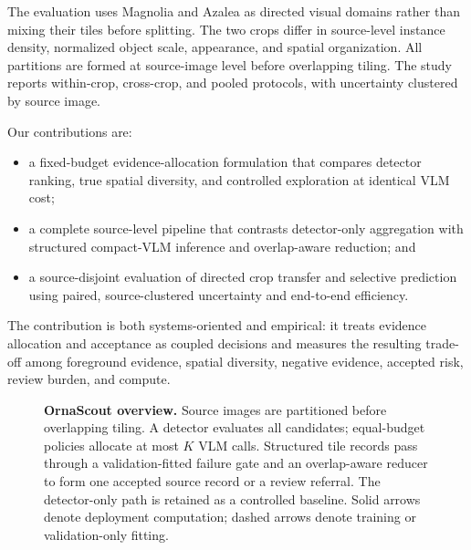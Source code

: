 The evaluation uses Magnolia and Azalea as directed visual domains rather than mixing their tiles before splitting. The two crops differ in source-level instance density, normalized object scale, appearance, and spatial organization. All partitions are formed at source-image level before overlapping tiling. The study reports within-crop, cross-crop, and pooled protocols, with uncertainty clustered by source image.

Our contributions are:
\begin{itemize}[leftmargin=*,nosep]
    \item a fixed-budget evidence-allocation formulation that compares detector ranking, true spatial diversity, and controlled exploration at identical VLM cost;
    \item a complete source-level pipeline that contrasts detector-only aggregation with structured compact-VLM inference and overlap-aware reduction; and
    \item a source-disjoint evaluation of directed crop transfer and selective prediction using paired, source-clustered uncertainty and end-to-end efficiency.
\end{itemize}

The contribution is both systems-oriented and empirical: it treats evidence allocation and acceptance as coupled decisions and measures the resulting trade-off among foreground evidence, spatial diversity, negative evidence, accepted risk, review burden, and compute.

\begin{figure}[t]
    \centering
    \resizebox{\textwidth}{!}{}
    \caption{\textbf{OrnaScout overview.} Source images are partitioned before overlapping tiling. A detector evaluates all candidates; equal-budget policies allocate at most $K$ VLM calls. Structured tile records pass through a validation-fitted failure gate and an overlap-aware reducer to form one accepted source record or a review referral. The detector-only path is retained as a controlled baseline. Solid arrows denote deployment computation; dashed arrows denote training or validation-only fitting.}
    \label{fig:architecture}
\end{figure}
